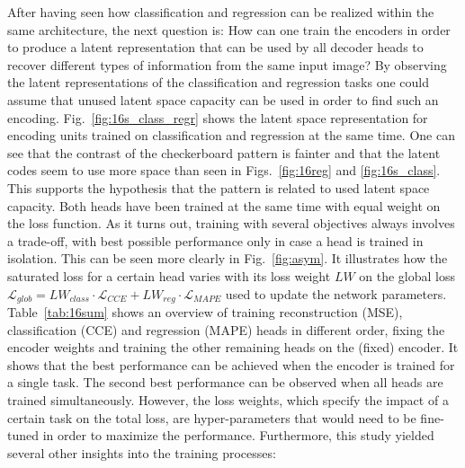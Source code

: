 \documentclass[../../main.tex]{subfiles}
\begin{document}
After having seen how classification and regression can be realized within the same architecture, the next question is: How can one train the encoders in order to produce a latent representation that can be used by all decoder heads to recover different types of information from the same input image? By observing the latent representations of the classification and regression tasks one could assume that unused latent space capacity can be used in order to find such an encoding. Fig.~\ref{fig:16s_class_regr} shows the latent space representation for encoding units trained on classification and regression at the same time. One can see that the contrast of the checkerboard pattern is fainter and that the latent codes seem to use more space than seen in Figs.~\ref{fig:16reg} and \ref{fig:16s_class}. This supports the hypothesis that the pattern is related to used latent space capacity. Both heads have been trained at the same time with equal weight on the loss function. As it turns out, training with several objectives always involves a trade-off, with best possible performance only in case a head is trained in isolation. This can be seen more clearly in Fig.~\ref{fig:asym}. It illustrates how the saturated loss for a certain head varies with its loss weight $LW$ on the global loss $\mathscr{L}_{glob}=LW_{class}\cdot \mathscr{L}_{CCE}+LW_{reg}\cdot \mathscr{L}_{MAPE}$ used to update the network parameters. Table~\ref{tab:16sum} shows an overview of training reconstruction (MSE), classification (CCE) and regression (MAPE) heads in different order, fixing the encoder weights and training the other remaining heads on the (fixed) encoder. It shows that the best performance can be achieved when the encoder is trained for a single task. The second best performance can be observed when all heads are trained simultaneously. However, the loss weights, which specify the impact of a certain task on the total loss, are hyper-parameters that would need to be fine-tuned in order to maximize the performance. Furthermore, this study yielded several other insights into the training processes:
\end{document}
